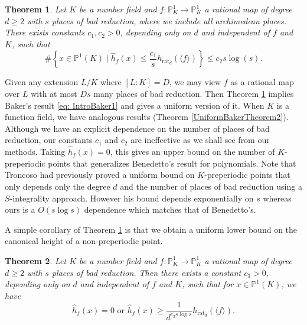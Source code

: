 \documentclass[10pt]{amsart}
\newcommand{\bb}{\mathbb}
\newcommand{\h}{\widehat{h}}
\newcommand{\rat}{\operatorname{rat}}
\newtheorem{theorem}{Theorem}
\numberwithin{theorem}{section}
\numberwithin{example}{section}
\numberwithin{definition}{section}
\begin{document}
\begin{theorem} \label{IntroUniformBaker1}
Let $K$ be a number field and $f: \bb{P}_K^1 \to \bb{P}_K^1$ a rational map of degree $d \geq 2$ with $s$ places of bad reduction, where we include all archimedean places. There exists constants $c_1,c_2 > 0$, depending only on $d$ and independent of $f$ and $K$, such that 
$$
\# \left\{ x \in \bb{P}^1(K) \mid \h_f(x) \leq \frac{c_1}{s} h_{\rat_d}(\langle f \rangle) \right\} \leq c_2 s \log(s).
$$
\end{theorem}

Given any extension $L/K$ where $[L:K] = D$, we may view $f$ as a rational map over $L$ with at most $Ds$ many places of bad reduction. Then Theorem \ref{IntroUniformBaker1} implies Baker's result \eqref{eq: IntroBaker1} and gives a uniform version of it. When $K$ is a function field, we have analogous results (Theorem \ref{UniformBakerTheorem2}). Although we have an explicit dependence on the number of places of bad reduction, our constants $c_1$ and $c_2$ are ineffective as we shall see from our methods. Taking $\h_f(x) = 0$, this gives an upper bound on the number of $K$-preperiodic points that generalizes Benedetto's result \cite{Ben07} for polynomials. Note that Troncoso \cite{Tro16} had previously proved a uniform bound on $K$-preperiodic points that only depends only the degree $d$ and the number of places of bad reduction using a $S$-integrality approach. However his bound depends exponentially on $s$ whereas ours is a $O(s \log s)$ dependence which matches that of Benedetto's. 
\par 
A simple corollary of Theorem \ref{IntroUniformBaker1} is that we obtain a uniform lower bound on the canonical height of a non-preperiodic point. 

\begin{theorem} \label{IntroUniformBaker2}
Let $K$ be a number field and $f: \bb{P}_K^1 \to \bb{P}_K^1$ a rational map of degree $d \geq 2$ with $s$ places of bad reduction. Then there exists a constant $c_3 > 0$, depending only on $d$ and independent of $f$ and $K$, such that for $x \in \bb{P}^1(K)$, we have 
$$\h_f(x) = 0 \text{ or } \h_f(x) \geq \frac{1}{d^{c_3 s \log s}} h_{\rat_d}(\langle f \rangle).$$
\end{theorem}
\end{document}

